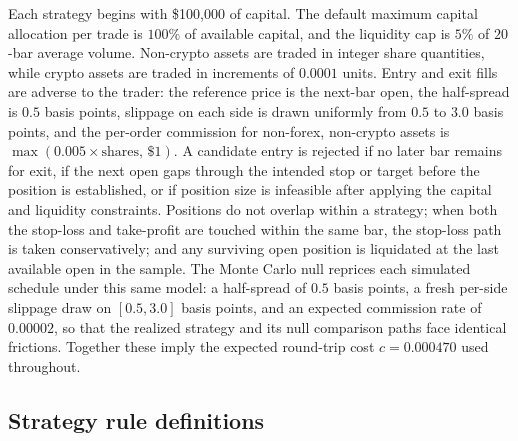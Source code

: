 \documentclass[preprint,12pt]{elsarticle}
\theoremstyle{definition}
\begin{document}
Each strategy begins with \$100{,}000 of capital. The default maximum capital allocation per trade is $100\%$ of available capital, and the liquidity cap is $5\%$ of $20$-bar average volume. Non-crypto assets are traded in integer share quantities, while crypto assets are traded in increments of $0.0001$ units. Entry and exit fills are adverse to the trader: the reference price is the next-bar open, the half-spread is $0.5$ basis points, slippage on each side is drawn uniformly from $0.5$ to $3.0$ basis points, and the per-order commission for non-forex, non-crypto assets is $\max(0.005\times\text{shares},\,\$1)$. A candidate entry is rejected if no later bar remains for exit, if the next open gaps through the intended stop or target before the position is established, or if position size is infeasible after applying the capital and liquidity constraints. Positions do not overlap within a strategy; when both the stop-loss and take-profit are touched within the same bar, the stop-loss path is taken conservatively; and any surviving open position is liquidated at the last available open in the sample. The Monte Carlo null reprices each simulated schedule under this same model: a half-spread of $0.5$ basis points, a fresh per-side slippage draw on $[0.5,3.0]$ basis points, and an expected commission rate of $0.00002$, so that the realized strategy and its null comparison paths face identical frictions. Together these imply the expected round-trip cost $c=0.000470$ used throughout.

\subsection{Strategy rule definitions}
\label{app:strategy_rules}
\end{document}
